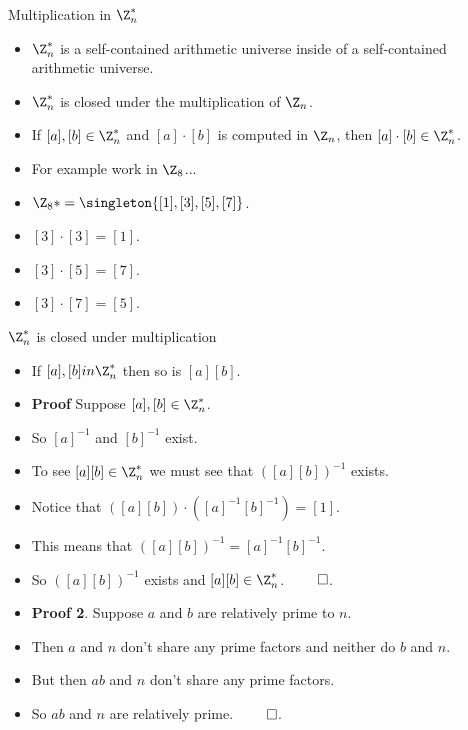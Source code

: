 \documentclass{beamer}
\begin{document}
\begin{frame}{Multiplication in $\Z^*_n$}

\begin{itemize}
  \item $\Z_n^*$ is a self-contained arithmetic universe inside of a self-contained
  arithmetic universe.
  \item $\Z_n^*$ is closed under the multiplication of $\Z_n$.
  \item If $[a],[b]\in\Z_n^*$ and $[a]\cdot[b]$ is computed in $\Z_n$, then
  $[a]\cdot[b]\in\Z_n^*$.
  \item For example work in $\Z_8$...
  \item $\Z_8* = \singleton{[1],[3],[5],[7]}$.
  \item $[3]\cdot [3] = [1]$.
  \item $[3]\cdot [5] = [7]$.
  \item $[3] \cdot [7] = [5]$.
\end{itemize}

\end{frame}

\begin{frame}{$\Z^*_n$ is closed under multiplication}

\begin{itemize}
  \item If $[a],[b] in\Z_n^*$ then so is $[a][b]$.
  \item \textbf{Proof} Suppose $[a],[b]\in\Z_n^*$.
  \item So $[a]^{-1}$ and $[b]^{-1}$ exist.
  \item To see $[a][b]\in\Z_n^*$ we must see that $([a][b])^{-1}$ exists.
  \item Notice that $([a][b])\cdot ([a]^{-1}[b]^{-1}) = [1]$.
  \item This means that $([a][b])^{-1} = [a]^{-1}[b]^{-1}$.
  \item So $([a][b])^{-1}$ exists and $[a][b]\in\Z_n^*$. $\qed$.
  \item \textbf{Proof 2}. Suppose $a$ and $b$ are relatively prime to $n$.
  \item Then $a$ and $n$ don't share any prime factors and neither do $b$ and $n$.
  \item But then $ab$ and $n$ don't share any prime factors.
  \item So $ab$ and $n$ are relatively prime. $\qed$.
\end{itemize}

\end{frame}
\end{document}
